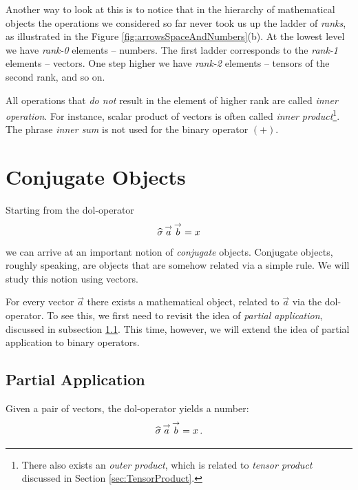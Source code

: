 Another way to look at this is to notice that in the hierarchy of
mathematical objects the operations we considered so far never took us
up the ladder of \emph{ranks}, as illustrated in the Figure
\ref{fig:arrowsSpaceAndNumbers}(b). At the lowest level we have
\emph{rank-0} elements -- numbers. The first ladder corresponds to the
\emph{rank-1} elements -- vectors. One step higher we have
\emph{rank-2} elements -- tensors of the second rank, and so on.

All operations that \emph{do not} result in the element of higher rank
are called \emph{inner operation}. For instance, scalar product of vectors is
often called \emph{inner product}\footnote{There also exists an
\emph{outer product}, which is related to \emph{tensor product}
discussed in Section \ref{sec:TensorProduct}.}. The
phrase \emph{inner sum} is not used for the binary operator $(+)$.

\section{Conjugate Objects}\label{sec:conjugateObjects}

Starting from the dol-operator
\[
\widehat{\sigma}\,\overset{\rightarrow}{a}\,\overset{\rightarrow}{b}=x
\]
we can arrive at an important notion of \emph{conjugate} objects.
Conjugate objects, roughly speaking, are objects that are somehow
related via a simple rule. We will study this notion using vectors.

For every vector $\vec{a}$ there exists a mathematical object, related
to $\vec{a}$ via the dol-operator. To see this, we first need to
revisit the idea of \emph{partial application}, discussed in subsection
\ref{subsec:PartialApplication}. This time, however, we will extend
the idea of partial application to binary operators.

\subsection{Partial Application}\label{subsec:PartialApplication}

Given a pair of vectors, the dol-operator yields a number:
\[
\widehat{\sigma}\,\overset{\rightarrow}{a}\,\overset{\rightarrow}{b} = x\,.
\]

